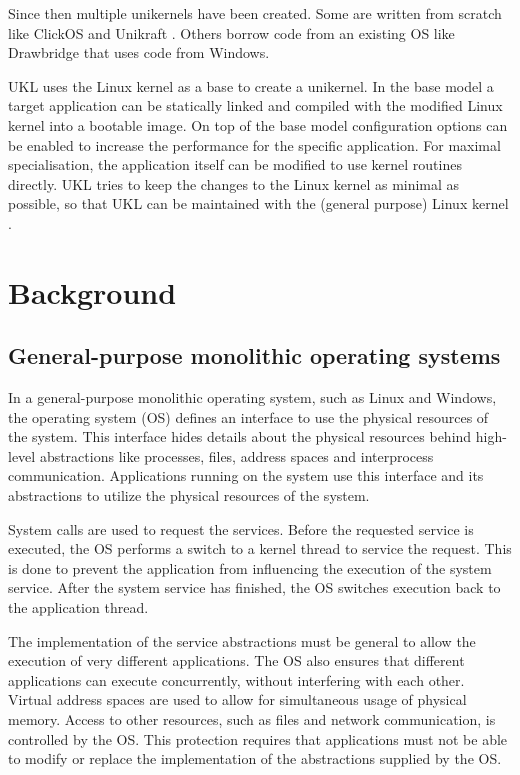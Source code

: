 \documentclass[10pt,twocolumn,a4paper]{article}
\begin{document}
  Since then multiple unikernels have been created. Some are written from scratch like
  ClickOS \cite{martins2014} and Unikraft \cite{kuenzer21}.
  Others borrow code from an existing OS like Drawbridge \cite{porter11} 
  that uses code from Windows.

  UKL uses the Linux kernel as a base to create a unikernel.
  In the base model a target application can be statically linked and compiled with
  the modified Linux kernel into a bootable image.
  On top of the base model configuration options can be enabled to increase the performance
  for the specific application.
  For maximal specialisation, the application itself can be modified to use kernel routines
  directly.
  UKL tries to keep the changes to the Linux kernel as minimal as possible,
  so that UKL can be maintained with the (general purpose) Linux kernel \cite{raza23}.
  

\section{Background}\label{sec:background}
  \subsection{General-purpose monolithic operating systems}
    In a general-purpose monolithic operating system, such as Linux and Windows,
    the operating system (OS) defines an interface to use the physical resources
    of the system. 
    This interface hides details about the physical resources behind
    high-level abstractions like processes, files, address spaces 
    and interprocess communication.
    Applications running on the system use this interface and its abstractions
    to utilize the physical resources of the system.

    System calls are used to request the services.
    Before the requested service is executed, the OS performs a switch to a kernel thread
    to service the request.
    This is done to prevent the application from influencing the execution of the system service.
    After the system service has finished, the OS switches execution back to the application thread.

    The implementation of the service abstractions must be general to allow the execution 
    of very different applications.
    The OS also ensures that different applications can execute concurrently, 
    without interfering with each other. 
    Virtual address spaces are used to allow for simultaneous usage of physical memory.
    Access to other resources, such as files and network communication, is controlled
    by the OS.
    This protection requires that applications must not be able
    to modify or replace the implementation of the abstractions supplied by the OS.
\end{document}
